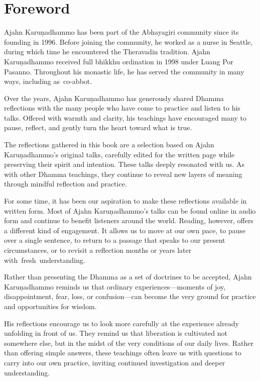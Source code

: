 \chapter{Foreword}

Ajahn Karuṇadhammo has been part of the Abhayagiri \mbox{community} since its founding in 1996. Before joining the community, he worked as a nurse in Seattle, during which time he encountered the Theravadin tradition. Ajahn Karuṇadhammo received full bhikkhu ordination in 1998 under Luang Por Pasanno. Throughout his monastic life, he has served the community in many ways, including \mbox{as co-abbot.}

Over the years, Ajahn Karuṇadhammo has generously shared Dhamma reflections with the many people who have come to practice and listen to his talks. Offered with warmth and clarity, his teachings have encouraged many to pause, reflect, and gently turn the heart toward what is true.

The reflections gathered in this book are a selection based on Ajahn Karuṇadhammo's original talks, carefully edited for the written page while preserving their spirit and intention. These talks deeply resonated with us. As with other Dhamma teachings, they continue to reveal new layers of meaning through mindful reflection and practice.

\enlargethispage{-1\baselineskip}
For some time, it has been our aspiration to make these reflections available in written form. Most of Ajahn Karuṇadhammo's talks can be found online in audio form and continue to benefit listeners around the world. Reading, however, offers a different kind of engagement. It allows us to move at our own pace, to pause over a single sentence, to return to a passage that speaks to our present circumstances, or to revisit a reflection months or years later \mbox{with fresh understanding.}

Rather than presenting the Dhamma as a set of doctrines to be accepted, Ajahn Karuṇadhammo reminds us that ordinary experiences---moments of joy, disappointment, fear, loss, or confusion---can become the very ground for practice and opportunities for wisdom.

His reflections encourage us to look more carefully at the experience already unfolding in front of us. They remind us that liberation is cultivated not somewhere else, but in the midst of the very conditions of our daily lives. Rather than offering simple answers, these teachings often leave us with questions to carry into our own practice, inviting continued investigation and deeper understanding.

